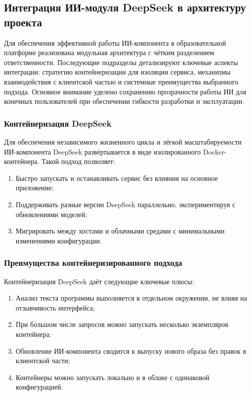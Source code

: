 \subsection{Интеграция ИИ-модуля DeepSeek в архитектуру проекта}

Для обеспечения эффективной работы ИИ-компонента в образовательной платформе реализована модульная архитектура с чётким разделением ответственности. Последующие подразделы детализируют ключевые аспекты интеграции: стратегию контейнеризации для изоляции сервиса, механизмы взаимодействия с клиентской частью и системные преимущества выбранного подхода. Основное внимание уделено сохранению прозрачности работы ИИ для конечных пользователей при обеспечении гибкости разработки и эксплуатации.

\subsubsection{Контейнеризация DeepSeek}
Для обеспечения независимого жизненного цикла и лёгкой масштабируемости ИИ-компонента DeepSeek развёртывается в виде изолированного Docker-контейнера. Такой подход позволяет:

\begin{enumerate}
  \item Быстро запускать и останавливать сервис без влияния на основное приложение;
  \item Поддерживать разные версии DeepSeek параллельно, экспериментируя с обновлениями моделей;
  \item Мигрировать между хостами и облачными средами с минимальными изменениями конфигурации.
\end{enumerate}

\subsubsection{Преимущества контейнеризированного подхода}
Контейнеризация DeepSeek даёт следующие ключевые плюсы:
\begin{enumerate}
  \item Анализ текста программы выполняется в отдельном окружении, не влияя на отзывчивость интерфейса;
  \item При большом числе запросов можно запускать несколько экземпляров контейнера;
  \item Обновление ИИ-компонента сводится к выпуску нового образа без правок в клиентской части;
  \item Контейнеры можно запускать локально и в облаке с одинаковой конфигурацией.
\end{enumerate}

